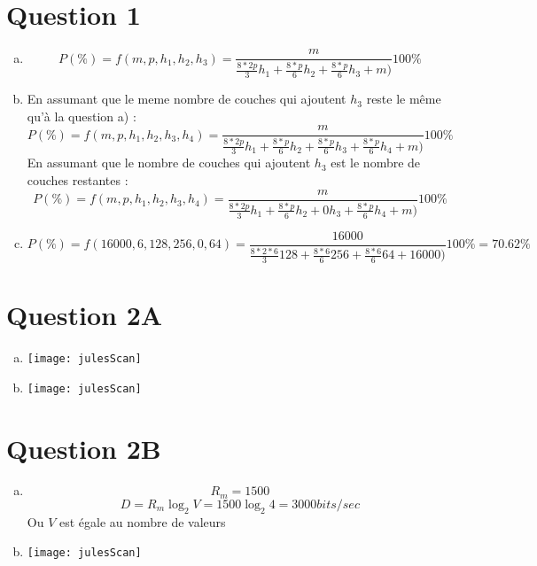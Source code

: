 
\section{Question 1}
\begin{enumerate}[(a)]
	\item 
		\[ P(\%) = f(m, p, h_1, h_2, h_3) = 
		\frac{m}{\frac{8*2p}{3}h_1 + \frac{8*p}{6}h_2 + \frac{8*p}{6}h_3 + m)} 100\%\]
	
	\item 
		En assumant que le meme nombre de couches qui ajoutent $h_3$ reste le même qu'à la
		question a) :
		\[ P(\%) = f(m, p, h_1, h_2, h_3, h_4) = 
		\frac{m}{\frac{8*2p}{3}h_1 + \frac{8*p}{6}h_2 + \frac{8*p}{6}h_3 + \frac{8*p}{6}h_4 + m)} 100\%\]
	En assumant que le nombre de couches qui ajoutent $h_3$ est le nombre de couches restantes :  
		\[ P(\%) = f(m, p, h_1, h_2, h_3, h_4) = 
		\frac{m}{\frac{8*2p}{3}h_1 + \frac{8*p}{6}h_2 + 0h_3 + \frac{8*p}{6}h_4 + m)} 100\%\]
	\item
		\[ P(\%) = f(16000, 6, 128, 256, 0, 64) = 
		\frac{16000}{\frac{8*2*6}{3}128 + \frac{8*6}{6}256 + \frac{8*6}{6}64 + 16000)} 100\% = 70.62\%\]
\end{enumerate}

\section{Question 2A}

\begin{enumerate}[(a)]
	\item
		\parbox{\linewidth}{\centering
		\texttt{[image: julesScan]}
		}
	\item
		\parbox{\linewidth}{\centering
		\texttt{[image: julesScan]}
		}

\end{enumerate}

\pagebreak

\section{Question 2B}

\begin{enumerate}[(a)]
	\item 
		\[R_m = 1500\]
		\[D = R_m\log_2 V = 1500\log_2 4 = 3000bits/sec\]
		Ou $V$ est égale au nombre de valeurs
	\item
		\parbox{\linewidth}{\centering
		\texttt{[image: julesScan]}
		}
		
\end{enumerate}

